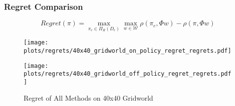 \documentclass{beamer}
\begin{document}
\begin{frame}
\frametitle{Regret Comparison}

 \[ Regret(\pi) = \max_{\pi_e \in \Pi_R(D_e)} \max_{w \in \mathcal{W}} \rho(\pi_e, \Phi w) - \rho(\pi, \Phi w)\]

\begin{figure}
  \begin{center}
  \begin{minipage}{0.45\linewidth}
    \centering
    \texttt{[image: plots/regrets/40x40\_gridworld\_on\_policy\_regret\_regrets.pdf]}
  \end{minipage}
  \hspace{0.05\linewidth}
  \begin{minipage}{0.45\linewidth}
    \centering
    \texttt{[image: plots/regrets/40x40\_gridworld\_off\_policy\_regret\_regrets.pdf]}
  \end{minipage}
  \end{center}
\caption{Regret of All Methods on 40x40 Gridworld}
\end{figure}

\end{frame}
\end{document}
